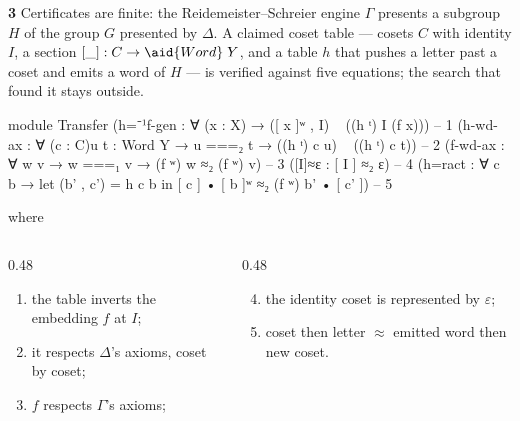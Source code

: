 \begin{frame}{\textbf{3}\; Certificates are finite: the Reidemeister--Schreier engine}
\small $\Gamma$ presents a subgroup $H$ of the group $G$ presented by $\Delta$.
A \alert{claimed} coset table --- cosets $C$ with identity $I$, a section
$[\_] : C\to\aid{Word}\;Y$, and a table $h$ that pushes a letter past a coset and
emits a word of $H$ --- is \alert{verified} against five equations; the search
that found it stays outside.
\vspace{4pt}

\renewcommand{\AgdaCodeStyle}{\scriptsize}
\begin{code}
module Transfer
  (h=⁻¹f-gen : ∀ (x : X) → ([ x ]ʷ , I) ~ ((h ᵗ) I (f x)))                         -- 1
  (h-wd-ax : ∀ (c : C){u t : Word Y} → u ===₂ t → ((h ᵗ) c u) ~ ((h ᵗ) c t))       -- 2
  (f-wd-ax : ∀ {w v} → w ===₁ v → (f ʷ) w ≈₂ (f ʷ) v)                              -- 3
  ([I]≈ε : [ I ] ≈₂ ε)                                                             -- 4
  (h=ract : ∀ c b → let (b' , c') = h c b in [ c ] • [ b ]ʷ ≈₂ (f ʷ) b' • [ c' ])  -- 5
\end{code}
\begin{code}[hide]
  where
\end{code}
\vspace{2pt}
\begin{columns}[T]
\begin{column}{0.48\textwidth}
\scriptsize
\begin{enumerate}
  \item the table inverts the embedding $f$ at $I$;
  \item it respects $\Delta$'s axioms, coset by coset;
  \item $f$ respects $\Gamma$'s axioms;
\end{enumerate}
\end{column}
\begin{column}{0.48\textwidth}
\scriptsize
\begin{enumerate}
  \setcounter{enumi}{3}
  \item the identity coset is represented by $\varepsilon$;
  \item coset then letter $\approx$ emitted word then new coset.
\end{enumerate}
\end{column}
\end{columns}
\end{frame}

